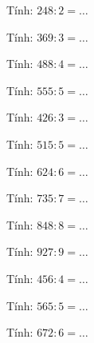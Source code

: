 \begin{ex}
Tính: $248 : 2 = \dots$
\end{ex}

\begin{ex}
Tính: $369 : 3 = \dots$
\end{ex}

\begin{ex}
Tính: $488 : 4 = \dots$
\end{ex}

\begin{ex}
Tính: $555 : 5 = \dots$
\end{ex}

\begin{ex}
Tính: $426 : 3 = \dots$
\end{ex}

\begin{ex}
Tính: $515 : 5 = \dots$
\end{ex}

\begin{ex}
Tính: $624 : 6 = \dots$
\end{ex}

\begin{ex}
Tính: $735 : 7 = \dots$
\end{ex}

\begin{ex}
Tính: $848 : 8 = \dots$
\end{ex}

\begin{ex}
Tính: $927 : 9 = \dots$
\end{ex}

\begin{ex}
Tính: $456 : 4 = \dots$
\end{ex}

\begin{ex}
Tính: $565 : 5 = \dots$
\end{ex}

\begin{ex}
Tính: $672 : 6 = \dots$
\end{ex}


